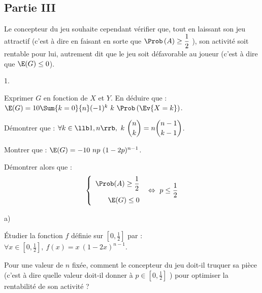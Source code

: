 \documentclass[11pt]{article}%
\begin{document}


\subsection*{Partie III}

\noindent
Le concepteur du jeu souhaite cependant vérifier que, tout en laissant
son jeu attractif (c'est à dire en faisant en sorte que
$\Prob\left(A\right) \geq \dfrac12$ ), son activité soit rentable pour
lui, autrement dit que le jeu soit défavorable au joueur (c'est à dire
que $\E(G) \leq 0$).

\begin{noliste}{1.}
  \setlength{\itemsep}{4mm}
\item Exprimer $G$ en fonction de $X$ et $Y$. En déduire que : $\E(G)
  = 10 \Sum{k = 0}{n} (-1)^{k} \ k \ \Prob\left(\Ev{X = k}\right)$.

  




\item Démontrer que : $\forall k \in \llb 1, n\rrb, \ k \
  \dbinom{n}{k} = n \dbinom{n-1}{k-1}$.

  

\item Montrer que : $\E(G) = -10 \ np \ (1-2p)^{n-1}$.

  




\item Démontrer alors que :
  \[
  \left\{ 
    \begin{array}{r}
      \Prob(A) \geq \dfrac{1}{2} 
      \\[.4cm]
      \E(G) \leq 0
    \end{array}
  \right. \ \Leftrightarrow \ p \leq \dfrac{1}{2}
  \]

  

\item 
  \begin{noliste}{a)} 
    \setlength{\itemsep}{2mm}
  \item Étudier la fonction $f$ définie sur $\left[0, \frac{1}{2}
    \right]$ par : $\forall x \in \left[0, \frac{1}{2} \right], \ f(x)
    = x \ (1-2x)^{n-1}$.

    

  \item Pour une valeur de $n$ fixée, comment le concepteur du jeu
    doit-il truquer sa pièce (c'est à dire quelle valeur doit-il
    donner à $p \in \left[0, \frac{1}{2} \right]$ ) pour optimiser la
    rentabilité de son activité ?

    
  \end{noliste}
\end{noliste}
\end{document}
